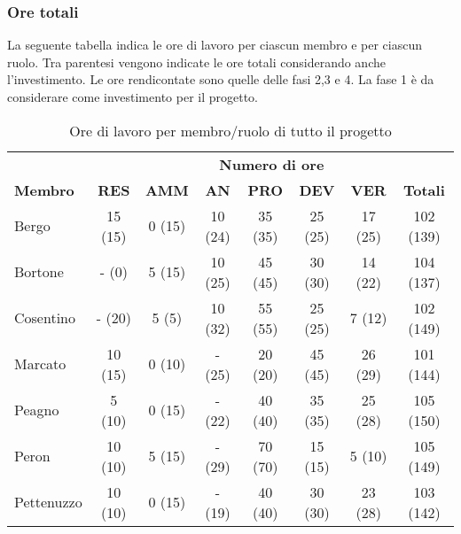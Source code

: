 	\subsubsection{Ore totali}
		La seguente tabella indica le ore di lavoro per ciascun membro e per ciascun ruolo. Tra parentesi vengono indicate le ore totali considerando anche l'investimento. Le ore rendicontate sono quelle delle fasi 2,3 e 4. La fase 1 è da considerare come investimento per il progetto.
		\begin{table}[h]
			\centering
			\begin{tabular}{| l | c c c c c c | c |}
				\rowcolor{LightBlue}
				& \multicolumn{7}{c}{\textbf{\color{white}Numero di ore}}	\\
		
				\rowcolor{LightBlue}
				\textbf{\color{white}Membro}
				& \textbf{\color{white}RES}
				& \textbf{\color{white}AMM}
				& \textbf{\color{white}AN}
				& \textbf{\color{white}PRO}
				& \textbf{\color{white}DEV}
				& \textbf{\color{white}VER}
				& \textbf{\color{white}Totali}\\
		
				Bergo 				& 15 (15) & 0 (15)		& 10 (24)	& 35 (35) & 25 (25) & 17 (25)	& 102 (139)\\
				Bortone 			& -  (0)  & 5 (15)		& 10	 (25)	& 45 (45) & 30 (30) & 14 (22)	& 104 (137)\\
				Cosentino 		& -  (20) & 5 (5)		& 10 (32)	& 55 (55) & 25 (25) & 7  (12)	& 102 (149)\\
				Marcato 			& 10 (15) & 0 (10)		& -  (25)	& 20 (20) & 45 (45) & 26 (29)	& 101 (144)\\
				Peagno 			& 5  (10) & 0 (15)		& -  (22)	& 40 (40) & 35 (35) & 25 (28)	& 105 (150)\\
				Peron 				& 10 (10) & 5 (15)		& -  (29)	& 70 (70) & 15 (15) & 5  (10)	& 105 (149)\\
				Pettenuzzo 	& 10 (10) & 0 (15) 	& -  (19)	& 40 (40) & 30 (30) & 23 (28)	& 103 (142)\\ \hline
			\end{tabular}
			\caption{Ore di lavoro per membro/ruolo di tutto il progetto}
		\end{table}
	

